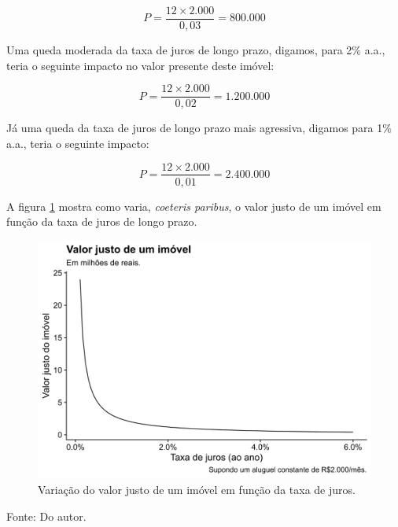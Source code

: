 \documentclass[
	12pt,				%
	oneside,			%
	a4paper,			%
	chapter=TITLE,		%
	section=TITLE,		%
	english,			%
	brazil				%
	]{abntex2}
\newcommand{\bcenter}{\begin{center}}
\newcommand{\ecenter}{\end{center}}
\begin{document}
\[P = \frac{12 \times 2.000}{0,03} = 800.000\]

Uma queda moderada da taxa de juros de longo prazo, digamos, para 2\% a.a.,
teria o seguinte impacto no valor presente deste imóvel:

\[P = \frac{12 \times 2.000}{0,02} = 1.200.000\]

Já uma queda da taxa de juros de longo prazo mais agressiva, digamos para 1\%
a.a., teria o seguinte impacto:

\[P = \frac{12 \times 2.000}{0,01} = 2.400.000\]

A figura \ref{fig:valores-juros} mostra como varia, \emph{coeteris paribus}, o valor
justo de um imóvel em função da taxa de juros de longo prazo.
\begin{figure}[H]

{\centering \includegraphics[width=0.7\linewidth]{images/valores-juros-1} 

}

\caption{Variação do valor justo de um imóvel em função da taxa de juros.}\label{fig:valores-juros}
\end{figure}
\bcenter

Fonte: Do autor.
\ecenter
\end{document}
